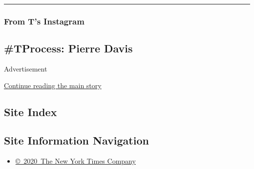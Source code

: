 \begin{center}\rule{0.5\linewidth}{\linethickness}\end{center}

\hypertarget{from-ts-instagram}{%
\subsubsection{From T's Instagram}\label{from-ts-instagram}}

\hypertarget{tprocess-pierre-davis}{%
\subsection{\#TProcess: Pierre Davis}\label{tprocess-pierre-davis}}

Advertisement

\protect\hyperlink{after-bottom}{Continue reading the main story}

\hypertarget{site-index}{%
\subsection{Site Index}\label{site-index}}

\hypertarget{site-information-navigation}{%
\subsection{Site Information
Navigation}\label{site-information-navigation}}

\begin{itemize}
\tightlist
\item
  \href{https://help.nytimes3xbfgragh.onion/hc/en-us/articles/115014792127-Copyright-notice}{©~2020~The
  New York Times Company}
\end{itemize}

